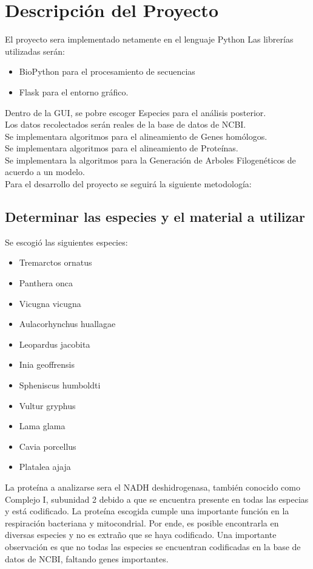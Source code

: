 \documentclass[a4paper]{article}
\begin{document}
\section{Descripción del Proyecto}

El proyecto sera implementado netamente en el lenguaje Python
Las librerías utilizadas serán:
\begin{itemize}
\item BioPython para el procesamiento de secuencias
\item Flask para el entorno gráfico.
\end{itemize}
Dentro de la GUI, se pobre escoger Especies para el análisis posterior.\\
Los datos recolectados serán reales de la base de datos de NCBI.\\
Se implementara algoritmos para el alineamiento de Genes homólogos.\\
Se implementara algoritmos para el alineamiento de Proteínas.\\
Se implementara la algoritmos para la Generación de Arboles Filogenéticos de acuerdo a un modelo.\\

\noindent Para el desarrollo del proyecto se seguirá la siguiente metodología:

\subsection{Determinar las especies y el material a utilizar}
Se escogió las siguientes especies:
\begin{itemize}
    \item Tremarctos ornatus
    \item Panthera onca
    \item Vicugna vicugna
    \item Aulacorhynchus huallagae
    \item Leopardus jacobita
    \item Inia geoffrensis
    \item Spheniscus humboldti
    \item Vultur gryphus
    \item Lama glama
    \item Cavia porcellus
    \item Platalea ajaja
\end{itemize}

La proteína a analizarse sera el NADH deshidrogenasa, también conocido como Complejo I, subunidad 2 debido a que se encuentra presente en todas las especias y está codificado. 
La proteína escogida cumple una importante función en la respiración bacteriana y mitocondrial. Por ende, es posible encontrarla en diversas especies y no es extraño que se haya codificado.
Una importante observación es que no todas las especies se encuentran codificadas en la base de datos de NCBI, faltando genes importantes.
\end{document}

